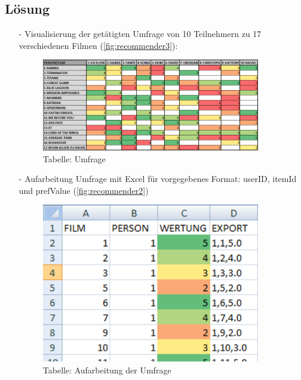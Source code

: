 \subsection{Lösung}
\begin{itemize}
\item[-] Visualisierung der getätigten Umfrage von 10 Teilnehmern zu 17 verschiedenen Filmen (\autoref{fig:recommender3}):
\begin{figure}[!htb]
        \begin{minipage}{1\textwidth}
                \centering
                \includegraphics[width=0.90\textwidth]{pics/recommender1.png}\par\vspace{0cm}
                \caption{Tabelle: Umfrage}
                \label{fig:recommender1}
        \end{minipage}
\end{figure}

\item[-] Aufarbeitung Umfrage mit Excel für vorgegebenes Format: userID, itemId und prefValue (\autoref{fig:recommender2})
\begin{figure}[!htb]
        \begin{minipage}{1\textwidth}
                \centering
                \includegraphics[width=0.90\textwidth]{pics/recommender2.png}\par\vspace{0cm}
                \caption{Tabelle: Aufarbeitung der Umfrage}
                \label{fig:recommender2}
        \end{minipage}
\end{figure}


\end{itemize}
